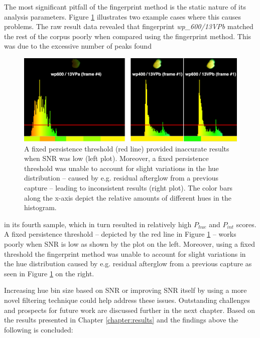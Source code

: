 \documentclass[thesis.tex]{subfiles}
\begin{document}
The most significant pitfall of the fingerprint method is the static nature of its analysis parameters. Figure \ref{figure:fingerprint-method-pitfalls} illustrates two example cases where this causes problems. The raw result data revealed that fingerprint \emph{wp\_600/13VPb} matched the rest of the corpus poorly when compared using the fingerprint method. This was due to the excessive number of peaks found

\begin{figure}[h!]
  \centering \includegraphics[page=1,width=\textwidth]{images/findings/persistance_pitfall}
  \caption{A fixed persistence threshold (red line) provided inaccurate results when SNR was low (left plot). Moreover, a fixed persistence threshold was unable to account for slight variations in the hue distribution -- caused by e.g. residual afterglow from a previous capture -- leading to inconsistent results (right plot). The color bars along the x-axis depict the relative amounts of different hues in the histogram.}
  \label{figure:fingerprint-method-pitfalls}
\end{figure}

\clearpage

\noindent in its fourth sample, which in turn resulted in relatively high $P_{hue}$ and $P_{int}$ scores. A fixed persistence threshold -- depicted by the red line in Figure \ref{figure:fingerprint-method-pitfalls} -- works poorly when SNR is low as shown by the plot on the left. Moreover, using a fixed threshold the fingerprint method was unable to account for slight variations in the hue distribution caused by e.g. residual afterglow from a previous capture as seen in Figure \ref{figure:fingerprint-method-pitfalls} on the right.

Increasing hue bin size based on SNR or improving SNR itself by using a more novel filtering technique could help address these issues. Outstanding challenges and prospects for future work are discussed further in the next chapter. Based on the results presented in Chapter \ref{chapter:results} and the findings above the following is concluded:
\end{document}
